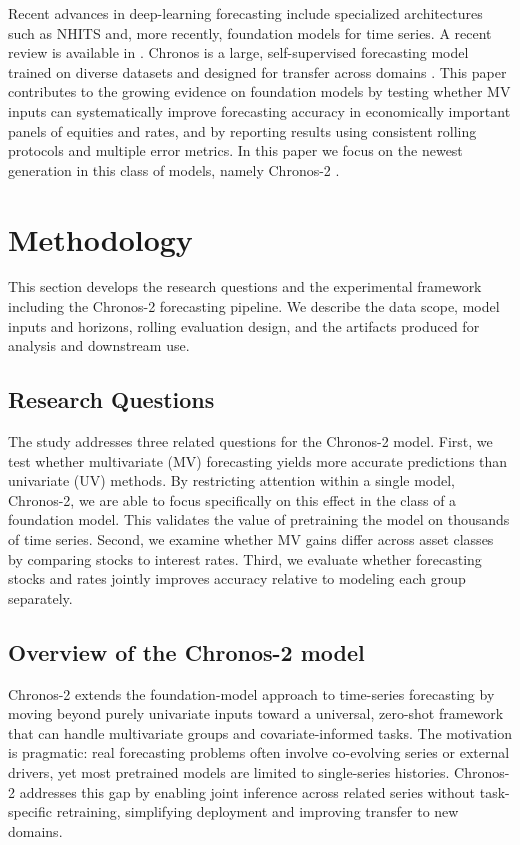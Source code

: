 \documentclass[twocolumn]{article}
\begin{document}
Recent advances in deep-learning forecasting include specialized architectures such as NHITS \citep{challu_nhits_2023} and, more recently, foundation models for time series. A recent review is available in \cite{zhang_review_2026}. Chronos is a large, self-supervised forecasting model trained on diverse datasets and designed for transfer across domains \citep{ansari_chronos_2024}. This paper contributes to the growing evidence on foundation models by testing whether MV inputs can systematically improve forecasting accuracy in economically important panels of equities and rates, and by reporting results using consistent rolling protocols and multiple error metrics. In this paper we focus on the newest generation in this class of models, namely Chronos-2 \citep{ansari_chronos-2_2025}.



\section{Methodology}

This section develops the research questions and the experimental framework including the Chronos-2 forecasting pipeline. We describe the data scope, model inputs and horizons, rolling evaluation design, and the artifacts produced for analysis and downstream use.

\subsection{Research Questions}
The study addresses three related questions for the Chronos-2 model. First, we test whether multivariate (MV) forecasting yields more accurate predictions than univariate (UV) methods. By restricting attention within a single model, Chronos-2, we are able to focus specifically on this effect in the class of a foundation model. This validates the value of pretraining the model on thousands of time series. Second, we examine whether MV gains differ across asset classes by comparing stocks to interest rates. Third, we evaluate whether forecasting stocks and rates jointly improves accuracy relative to modeling each group separately. 

\subsection{Overview of the Chronos-2 model}

Chronos-2 \citep{ansari_chronos-2_2025} extends the foundation-model approach to time-series forecasting by moving beyond purely univariate inputs toward a universal, zero-shot framework that can handle multivariate groups and covariate-informed tasks. The motivation is pragmatic: real forecasting problems often involve co-evolving series or external drivers, yet most pretrained models are limited to single-series histories. Chronos-2 addresses this gap by enabling joint inference across related series without task-specific retraining, simplifying deployment and improving transfer to new domains.
\end{document}
